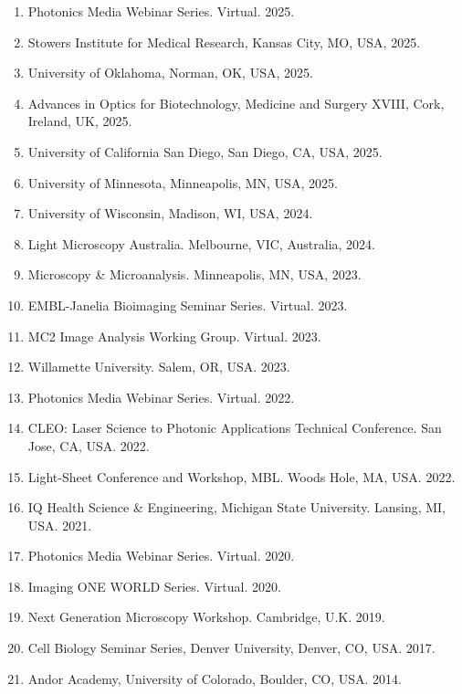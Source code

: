 \begin{enumerate}
\item Photonics Media Webinar Series.   Virtual. 2025.
\item Stowers Institute for Medical Research, Kansas City, MO, USA, 2025.
\item University of Oklahoma, Norman, OK, USA, 2025.
\item Advances in Optics for Biotechnology, Medicine and Surgery XVIII, Cork, Ireland, UK, 2025.
\item University of California San Diego, San Diego, CA, USA, 2025.
\item University of Minnesota, Minneapolis, MN, USA, 2025.
\item University of Wisconsin, Madison, WI, USA, 2024.
\item Light Microscopy Australia. Melbourne, VIC, Australia, 2024.
\item Microscopy \& Microanalysis. Minneapolis, MN, USA, 2023.
\item EMBL-Janelia Bioimaging Seminar Series. Virtual. 2023.
\item MC2 Image Analysis Working Group. Virtual. 2023.
\item Willamette University.  Salem, OR, USA. 2023.
\item Photonics Media Webinar Series.   Virtual. 2022.
\item CLEO: Laser Science to Photonic Applications Technical Conference. San Jose, CA, USA. 2022.
\item Light-Sheet Conference and Workshop, MBL.  Woods Hole, MA, USA. 2022.
\item IQ Health Science \& Engineering, Michigan State University. Lansing, MI, USA. 2021.
\item Photonics Media Webinar Series.  Virtual. 2020.
\item Imaging ONE WORLD Series. Virtual. 2020.
\item Next Generation Microscopy Workshop.  Cambridge, U.K. 2019.
\item Cell Biology Seminar Series, Denver University, Denver, CO, USA. 2017.
\item Andor Academy, University of Colorado, Boulder, CO, USA. 2014.
\end{enumerate}